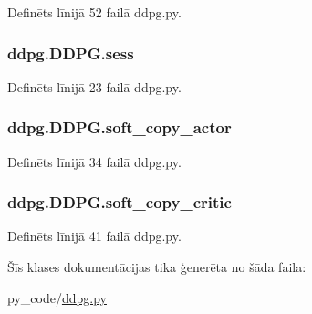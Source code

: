 Definēts līnijā 52 failā ddpg.\+py.

\subsubsection[{\texorpdfstring{sess}{sess}}]{\setlength{\rightskip}{0pt plus 5cm}ddpg.\+D\+D\+P\+G.\+sess}\hypertarget{classddpg_1_1_d_d_p_g_a9fed3bda5c1636b1c4bb89fe3a4293c5}{}\label{classddpg_1_1_d_d_p_g_a9fed3bda5c1636b1c4bb89fe3a4293c5}


Definēts līnijā 23 failā ddpg.\+py.

\subsubsection[{\texorpdfstring{soft\+\_\+copy\+\_\+actor}{soft_copy_actor}}]{\setlength{\rightskip}{0pt plus 5cm}ddpg.\+D\+D\+P\+G.\+soft\+\_\+copy\+\_\+actor}\hypertarget{classddpg_1_1_d_d_p_g_a2bb041b9ab7c84c83f584a1eae593a87}{}\label{classddpg_1_1_d_d_p_g_a2bb041b9ab7c84c83f584a1eae593a87}


Definēts līnijā 34 failā ddpg.\+py.

\subsubsection[{\texorpdfstring{soft\+\_\+copy\+\_\+critic}{soft_copy_critic}}]{\setlength{\rightskip}{0pt plus 5cm}ddpg.\+D\+D\+P\+G.\+soft\+\_\+copy\+\_\+critic}\hypertarget{classddpg_1_1_d_d_p_g_a01b575596a4ae50a5ee3656ce9529c94}{}\label{classddpg_1_1_d_d_p_g_a01b575596a4ae50a5ee3656ce9529c94}


Definēts līnijā 41 failā ddpg.\+py.



Šīs klases dokumentācijas tika ģenerēta no šāda faila\+:\begin{DoxyCompactItemize}
\item 
py\+\_\+code/\hyperlink{ddpg_8py}{ddpg.\+py}\end{DoxyCompactItemize}
